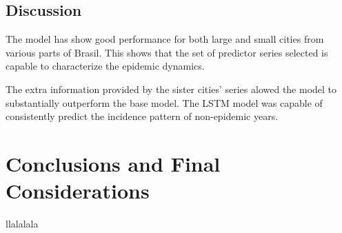 \documentclass[12pt]{report}
\begin{document}
\section{Discussion}

The model has show good performance for both large and small cities from 
various parts of Brasil. This shows that the set of predictor series selected 
is capable to characterize the epidemic dynamics.

The extra information provided by the sister cities' series alowed the 
model to substantially outperform the base model. The LSTM model was 
capable of consistently predict the incidence pattern of non-epidemic years. 

\newpage
\chapter{Conclusions and Final Considerations}

\newpage
{}
{}



\newpage
{}
{}
llalalala
\end{document}
